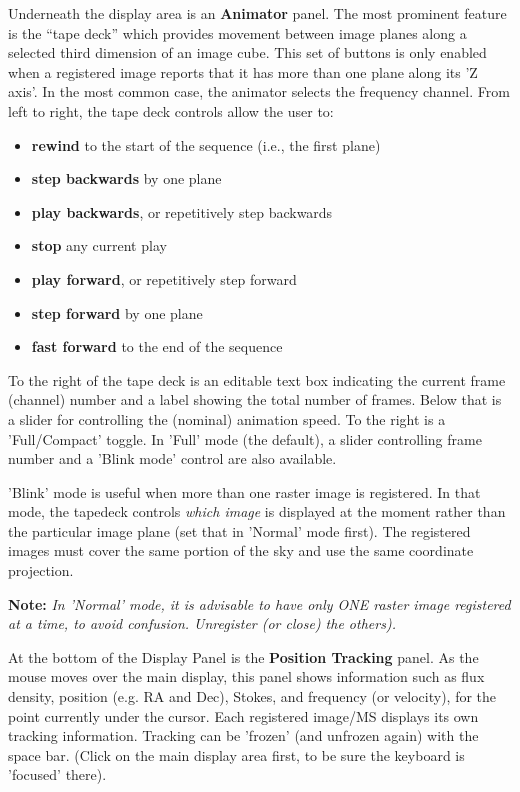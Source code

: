 Underneath the display area is an {\bf Animator} panel.  The most prominent
feature is the ``tape deck'' which provides movement between image planes
along a selected third dimension of an image cube. This set of buttons is
only enabled when a registered image reports that it has more than one plane
along its 'Z axis'. In the most common case, the animator selects the frequency
channel. From left to right, the tape deck controls allow the user to:
\begin{itemize}
   \item {\bf rewind} to the start of the sequence (i.e., the first plane)
   \item {\bf step backwards} by one plane
   \item {\bf play backwards}, or repetitively step backwards
   \item {\bf stop} any current play
   \item {\bf play forward}, or repetitively step forward
   \item {\bf step forward} by one plane
   \item {\bf fast forward} to the end of the sequence
\end{itemize}
To the right of the tape deck is an editable text box indicating the
current frame (channel) number and a label showing the total number of
frames. Below that is a slider for controlling the (nominal) animation
speed. To the right is a 'Full/Compact' toggle. In 'Full' mode (the
default), a slider controlling frame number and a 'Blink mode' control
are also available.

'Blink' mode is useful when more than one raster image is
registered. In that mode, the tapedeck controls {\it which image} is
displayed at the moment rather than the particular image plane
(set that in 'Normal' mode first). The registered images must cover the
same portion of the sky and use the same coordinate projection.

{\bf Note:} {\em In 'Normal' mode, it is advisable to have only ONE
raster image registered at a time, to avoid confusion. Unregister (or
close) the others).}

At the bottom of the Display Panel is the {\bf Position Tracking} panel.  As
the mouse moves over the main display, this panel shows information such as
flux density, position (e.g. RA and Dec), Stokes, and frequency (or velocity),
for the point currently under the cursor.  Each registered image/MS displays
its own tracking information.  Tracking can be 'frozen' (and unfrozen again)
with the space bar.  (Click on the main display area first, to be sure the
keyboard is 'focused' there).

